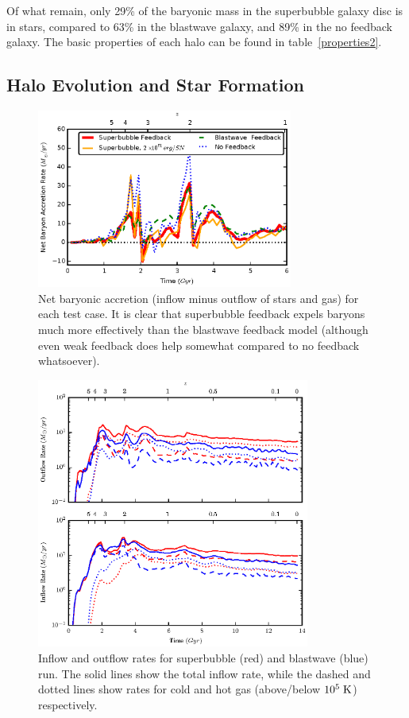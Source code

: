 Of what remain, only 29\% of the baryonic mass in the superbubble galaxy disc is
in stars, compared to 63\% in the blastwave galaxy, and 89\% in the no
feedback galaxy.  The basic properties of each halo can be found in
table~\ref{properties2}.

\subsection{Halo Evolution and Star Formation}
\begin{figure}
    \includegraphics[width=0.75\textwidth]{figures2/net_accretion.eps}
    \caption[Net baryonic accretion for different feedback models]{Net baryonic
    accretion (inflow minus outflow of stars and gas) for each test case.  It is clear that superbubble
    feedback expels baryons much more effectively than the blastwave feedback
    model (although even weak feedback does help somewhat compared to no
    feedback whatsoever).}
    \label{net_accretion2}
\end{figure}
\begin{figure}
    \includegraphics[width=0.8\textwidth]{figures2/inflowoutflow.eps}
    \caption[Inflow and outflow rates for different feedback models]{Inflow and
    outflow rates for superbubble (red) and blastwave (blue) run.  The solid
    lines show the total inflow rate, while the dashed and dotted lines show
    rates for cold and hot gas (above/below $10^5\; \rm{K}$) respectively.  }
    \label{inflow_outflow2}
\end{figure}
